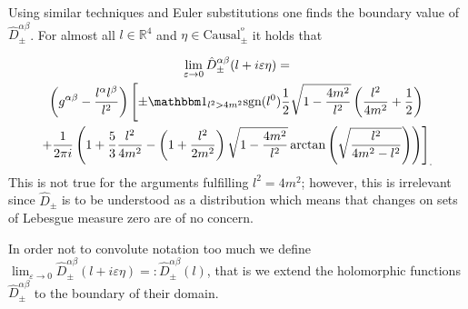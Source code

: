 \documentclass[b5paper,draft,openbib,12pt]{memoir}
\newcommand{\id}{{\mathbbm 1}}
\begin{document}




Using similar techniques and Euler substitutions one finds the boundary value of \(\hat{D}^{\alpha \beta}_{\pm}\). For almost all \(l\in\mathbb{R}^4\) and \(\eta \in \text{Causal}^º_{\pm}\) it holds that

\begin{multline}\label{splitting_result}
\lim_{\varepsilon \rightarrow 0} \hat{D}^{\alpha \beta}_{\pm}(l+i\varepsilon \eta)=\\
 \left(g^{\alpha \beta} - \frac{l^{\alpha} l^{\beta}}{l^2}\right)\left[ \pm \id_{l^2>4m^2} \text{sgn}(l^0) \frac{1}{2}\sqrt{1-  \frac{4m^2}{l^2}} \left( \frac{l^2}{4m^2}+\frac{1}{2}\right)  \right. \\
\left.  +\frac{1}{2\pi i}\left( 1+\frac{5}{3} \frac{l^2}{4m^2}-\left(1+ \frac{l^2} {2m^2}\right)\sqrt{1-\frac{4m^2}{l^2}}\arctan \left( \sqrt{\frac{l^2}{4m^2-l^2}} \right)\right)   \right]_.
\end{multline}
This is not true for the arguments fulfilling \(l^2=4m^2\); however, this is irrelevant since \(\hat{D}_{\pm}\) is to be understood as a distribution which means that changes on sets of Lebesgue measure zero are of no concern.


In order not to convolute notation too much we define 
\(\lim_{\varepsilon\rightarrow 0} \hat{D}^{\alpha \beta}_{\pm}(l+i\varepsilon \eta)=: \hat{D}^{\alpha \beta}_{\pm}(l)\), that is we extend 
the holomorphic functions \(\hat{D}^{\alpha \beta}_{\pm}\) to the boundary of their domain. 
\end{document}

